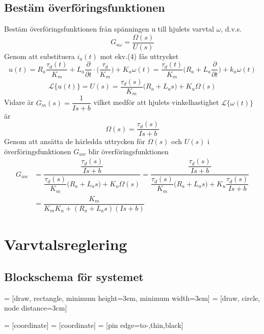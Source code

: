 \documentclass[11pt]{article}
\begin{document}
\subsection{Bestäm överföringsfunktionen}
Bestäm överföringsfunktionen från spänningen u till hjulets varvtal $\omega$, d.v.s.
$$
G_{u\omega}=\dfrac{\Omega(s)}{U(s)}
$$
Genom att substituera $i_a(t)$ mot ekv.(4) fås uttrycket
\begin{equation*}
u(t)=R_a\dfrac{\tau_d(t)}{K_m}+L_a\dfrac{\partial}{\partial t}\cdot\Big( \dfrac{\tau_d}{K_m}\Big)+K_u\omega(t) = \dfrac{\tau_d(t)}{K_m}\Big(R_a+L_a\dfrac{\partial}{\partial t}\Big)+k_u\omega(t)
\end{equation*}
\begin{equation*}
\mathcal{L}\{u(t)\} =U(s)= \dfrac{\tau_d(s)}{K_m}\Big(R_a+L_as\Big)+K_u\Omega(s)
\end{equation*}\newpage
Vidare är $G_m(s)=\dfrac{1}{Is+b}$ vilket medför att hjulets vinkelhastighet $\mathcal{L}\{\omega(t)\}$ är
\begin{equation*}
\Omega(s)=\dfrac{\tau_d(s)}{Is+b}
\end{equation*}
Genom att ansätta de härledda uttrycken för $\Omega(s)$ och $U(s)$ i överföringsfunktionen $G_{uw}$ blir överföringsfunktionen
\begin{equation*}
\begin{split}
G_{uw} &= \dfrac{\dfrac{\tau_d(s)}{Is+b}}{\dfrac{\tau_d(s)}{K_m}\Big(R_a+L_as\Big)+K_u\Omega(s)} = \dfrac{\dfrac{\tau_d(s)}{Is+b}}{\dfrac{\tau_d(s)}{K_m}\Big(R_a+L_as\Big)+K_u\dfrac{\tau_d(s)}{Is+b}}\\
&=\dfrac{K_m}{K_mK_u+(R_a+L_as)(Is+b)}
\end{split}
\end{equation*}
\section{Varvtalsreglering}
\subsection{Blockschema för systemet}
 = [draw, rectangle, 
    minimum height=3em, minimum width=3em]
 = [draw, circle, node distance=3cm]


 = [coordinate]
 = [coordinate]
 = [pin edge={to-,thin,black}]
\newcommand{\summa}{\huge$\sum_{}^{}$}
\end{document}
